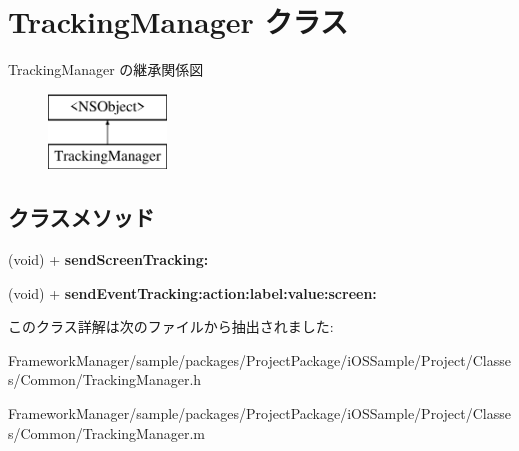 \hypertarget{interface_tracking_manager}{}\section{Tracking\+Manager クラス}
\label{interface_tracking_manager}
Tracking\+Manager の継承関係図\begin{figure}[H]
\begin{center}
\leavevmode
\includegraphics[height=2.000000cm]{interface_tracking_manager}
\end{center}
\end{figure}
\subsection*{クラスメソッド}
\begin{DoxyCompactItemize}
\item 
\hypertarget{interface_tracking_manager_ad9bd64baaef69a8bcb2997ae2c3934cb}{}(void) + {\bfseries send\+Screen\+Tracking\+:}\label{interface_tracking_manager_ad9bd64baaef69a8bcb2997ae2c3934cb}

\item 
\hypertarget{interface_tracking_manager_a67982002389efccd28ce7bf288a18a8f}{}(void) + {\bfseries send\+Event\+Tracking\+:action\+:label\+:value\+:screen\+:}\label{interface_tracking_manager_a67982002389efccd28ce7bf288a18a8f}

\end{DoxyCompactItemize}


このクラス詳解は次のファイルから抽出されました\+:\begin{DoxyCompactItemize}
\item 
Framework\+Manager/sample/packages/\+Project\+Package/i\+O\+S\+Sample/\+Project/\+Classes/\+Common/Tracking\+Manager.\+h\item 
Framework\+Manager/sample/packages/\+Project\+Package/i\+O\+S\+Sample/\+Project/\+Classes/\+Common/Tracking\+Manager.\+m\end{DoxyCompactItemize}
